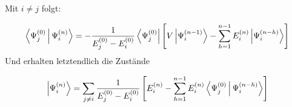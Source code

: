 Mit $i \neq j$ folgt:

\begin{align}
\Braket{\Psi_j^{\left( 0 \right)} | \Psi_i^{\left( n \right)}} = - \frac{1}{E_j^{\left( 0 \right)} - E_i^{\left( 0 \right)}} \Bra{\Psi_j^{\left( 0 \right)}} \left[ V \Ket{\Psi_i^{\left( n-1 \right)}} - \sum_{h=1}^{n-1} E_i^{\left( n \right)} \Ket{\Psi_i^{\left( n-h \right)}} \right]
\end{align}
Und erhalten letztendlich die Zust\"ande

\begin{equation}
\Ket{\Psi_i^{\left( n \right)}} = \sum_{j \neq i} \frac{1}{E_j^{\left( 0 \right)} - E_i^{\left( 0 \right)}} \left[ E_i^{\left( n \right)} - \sum_{h=1}^{n-1} E_i^{\left( n \right)} \Braket{\Psi_j^{\left( 0 \right)}|\Psi_i^{\left( n-h \right)}} \right]
\end{equation}